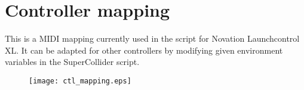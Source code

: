 \documentclass{article}
\begin{document}
\newpage
\section*{Controller mapping}
This is a MIDI mapping currently used in the script for Novation Launchcontrol XL.
It can be adapted for other controllers by modifying given environment variables in the SuperCollider script. 
\begin{figure}[h]
\centering
\texttt{[image: ctl\_mapping.eps]}
\end{figure}

\newpage

\end{document}
